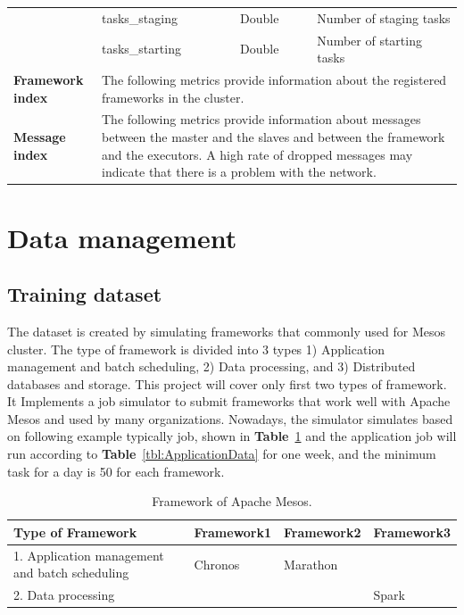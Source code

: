 \documentclass[12pt,oneside,openright,a4paper]{cpe-english-project}
\begin{document}
\begin{table}[!h]
\begin{tabular}{|p{}|p{}|p{}|p{}|}
    \cline{2-4} & tasks\_staging & Double & Number of staging tasks \\ 
    \cline{2-4} & tasks\_starting & Double & Number of starting tasks \\ 
    \hline
    \textbf{Framework index} & \multicolumn{3}{p{0.7\textwidth}|}{ The following metrics provide information about the registered frameworks in the cluster.} \\ 
    \hline
    \textbf{Message index} & \multicolumn{3}{p{0.7\textwidth}|}{ The following metrics provide information about messages between the master and the slaves and between the framework and the executors. A high rate of dropped messages may indicate that there is a problem with the network.} \\ 
    \hline
  \end{tabular}
\end{table}

\newpage

\section{Data management}

\subsection{Training dataset}

\hspace{10mm}The dataset is created by simulating frameworks that commonly used for Mesos cluster. The type of framework is divided into 3 types 1) Application management and batch scheduling, 2) Data processing, and 3) Distributed databases and storage. This project will cover only first two types of framework. It Implements a job simulator to submit frameworks that work well with Apache Mesos and used by many organizations. Nowadays, the simulator simulates based on following example typically job, shown in \textbf{Table}~\ref{tbl:MesosFramework} and the application job will run according to \textbf{Table}~\ref{tbl:ApplicationData} for one week, and the minimum task for a day is 50 for each framework.

\begin{table}[!h]
  \caption{Framework of Apache Mesos.}\label{tbl:MesosFramework}
    \begin{tabular}{@{}|p{}|p{}|p{}|p{}|}
    \hline
    \textbf{Type of Framework} & \textbf{Framework1} & \textbf{Framework2} & \textbf{Framework3}\\
    \hline
    1. Application management and batch scheduling & Chronos & Marathon & \\
    \hline
    2. Data processing &  & & Spark\\
    \hline
  \end{tabular}
\end{table}
\end{document}
